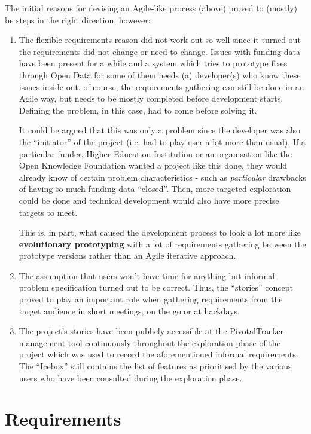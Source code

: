 The initial reasons for devising an Agile-like process (above) proved to (mostly) be steps in the right direction, however:
\begin{enumerate}
 \item The flexible requirements reason did not work out so well since it turned out the requirements did not change or need to change. Issues with funding data have been present for a while and a system which tries to prototype fixes through Open Data for some of them needs (a) developer(s) who know these issues inside out. of course, the requirements gathering can still be done in an Agile way, but needs to be mostly completed before development starts. Defining the problem, in this case, had to come before solving it.
 
 It could be argued that this was only a problem since the developer was also the ``initiator'' of the project (i.e. had to play user a lot more than usual). If a particular funder, Higher Education Institution or an organisation like the Open Knowledge Foundation wanted a project like this done, they would already know of certain problem characteristics - such as \emph{particular} drawbacks of having so much funding data ``closed''. Then, more targeted exploration could be done and technical development would also have more precise targets to meet.
 
 This is, in part, what caused the development process to look a lot more like \textbf{evolutionary prototyping} with a lot of requirements gathering between the prototype versions rather than an Agile iterative approach.
 
 \item The assumption that users won't have time for anything but informal problem specification turned out to be correct. Thus, the ``stories'' concept proved to play an important role when gathering requirements from the target audience in short meetings, on the go or at hackdays.
 
 \item The project's stories have been publicly accessible at the PivotalTracker management tool continuously throughout the exploration phase of the project which was used to record the aforementioned informal requirements. The ``Icebox'' still contains the list of features as prioritised by the various users who have been consulted during the exploration phase.
\end{enumerate}

\section{Requirements}
\label{devprocess-requirements}

